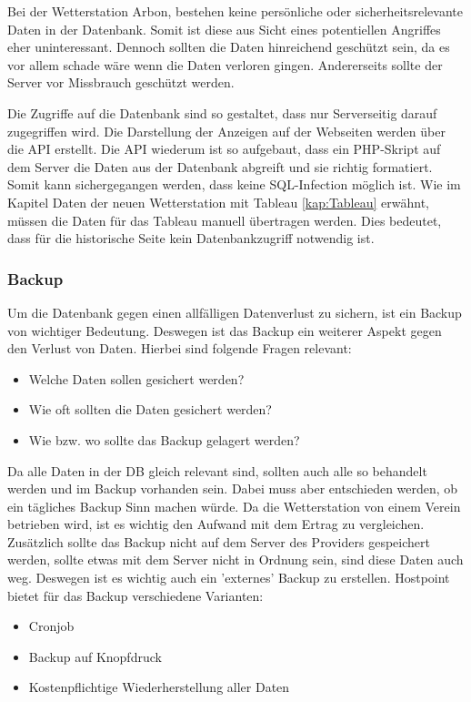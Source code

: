 Bei der Wetterstation Arbon, bestehen keine persönliche oder sicherheitsrelevante Daten in der Datenbank. Somit ist diese aus Sicht eines potentiellen Angriffes eher uninteressant. Dennoch sollten die Daten hinreichend geschützt sein, da es vor allem schade wäre wenn die Daten verloren gingen. Andererseits sollte der Server vor Missbrauch geschützt werden.

Die Zugriffe auf die Datenbank sind so gestaltet, dass nur Serverseitig darauf zugegriffen wird. Die Darstellung der Anzeigen auf der Webseiten werden über die API erstellt. Die API wiederum ist so aufgebaut, dass ein PHP-Skript auf dem Server die Daten aus der Datenbank abgreift und sie richtig formatiert. Somit kann sichergegangen werden, dass keine SQL-Infection möglich ist. Wie im Kapitel Daten der neuen Wetterstation mit Tableau \ref{kap:Tableau} erwähnt, müssen die Daten für das Tableau manuell übertragen werden. Dies bedeutet, dass für die historische Seite kein Datenbankzugriff notwendig ist.

\subsubsection{Backup}
Um die Datenbank gegen einen allfälligen Datenverlust zu sichern, ist ein Backup von wichtiger Bedeutung. Deswegen ist das Backup ein weiterer Aspekt gegen den Verlust von Daten. Hierbei sind folgende Fragen relevant:
\begin{itemize}
\item Welche Daten sollen gesichert werden?
\item Wie oft sollten die Daten gesichert werden?
\item Wie bzw. wo sollte das Backup gelagert werden?
\end{itemize}

Da alle Daten in der DB gleich relevant sind, sollten auch alle so behandelt werden und im Backup vorhanden sein. Dabei muss aber entschieden werden, ob ein tägliches Backup Sinn machen würde. Da die Wetterstation von einem Verein betrieben wird, ist es wichtig den Aufwand mit dem Ertrag zu vergleichen. Zusätzlich sollte das Backup nicht auf dem Server des Providers gespeichert werden, sollte etwas mit dem Server nicht in Ordnung sein, sind diese Daten auch weg. Deswegen ist es wichtig auch ein 'externes' Backup zu erstellen. Hostpoint bietet für das Backup verschiedene Varianten:
\begin{itemize}
\item Cronjob
\item Backup auf Knopfdruck
\item Kostenpflichtige Wiederherstellung aller Daten
\end{itemize}


